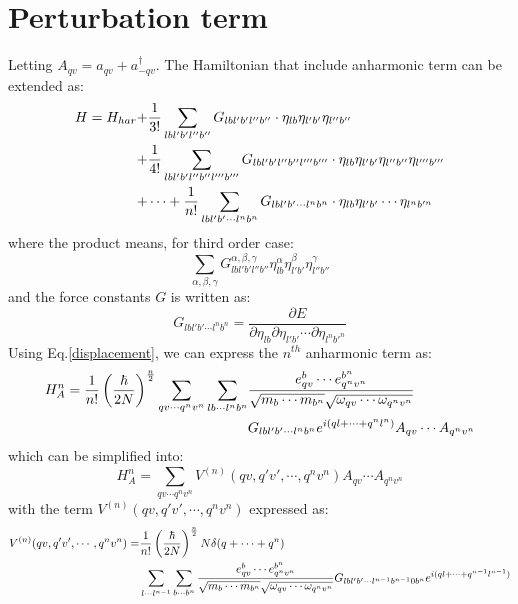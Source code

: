 \documentclass{article}
\begin{document}
\section{Perturbation term}
Letting $A_{qv} = a_{qv} + a^{\dagger}_{-qv}$. The Hamiltonian that include anharmonic term can be extended as:
\begin{align}
    H = H_{har} + &\frac{1}{3!}\sum_{lbl'b'l''b''} G_{lbl'b'l''b''} \cdot \eta_{lb} \eta_{l'b'}\eta_{l''b''} \notag \\
                + &\frac{1}{4!}\sum_{lbl'b'l''b''l'''b'''} G_{lbl'b'l''b''l'''b'''} \cdot \eta_{lb} \eta_{l'b'}\eta_{l''b''} \eta_{l'''b'''} \notag \\
                + & \cdots + \frac{1}{n!}\sum_{lbl'b'\cdots l^nb^n} G_{lbl'b'\cdots l^nb^n} \cdot \eta_{lb} \eta_{l'b'}\cdots \eta_{l^nb'^n} 
\end{align}
where the product means, for third order case:
\begin{equation}
    \sum_{\alpha,\beta,\gamma} G_{lbl'b'l''b''}^{\alpha,\beta,\gamma} \eta_{lb}^{\alpha} \eta_{l'b'}^{\beta}\eta_{l''b''}^{\gamma}
\end{equation}
and the force constants $G$ is written as:
\begin{equation}
    G_{lbl'b'\cdots l^nb^n} = \frac{\partial E}{\partial \eta_{lb} \partial \eta_{l'b'} \cdots \partial \eta_{l^nb'^n} }
\end{equation}
Using Eq.\ref{displacement}, we can express the $n^{th}$ anharmonic term as:
\begin{align}
    H_{A}^{n} = \frac{1}{n!} \left( \frac{\hbar}{2N} \right)^{\frac{n}{2}} \sum_{qv \cdots q^nv^n} \sum_{lb\cdots l^nb^n} 
    &\frac{e_{qv}^b \cdots e_{q^nv^n}^{b^n}}{\sqrt{m_b \cdots m_{b^n}}\sqrt{\omega_{qv} \cdots \omega_{q^nv^n}}} \notag \\
    &G_{lbl'b'\cdots l^nb^n} e^{i(ql + \cdots + q^nl^n)}
    A_{qv} \cdots A_{q^nv^n}
\end{align}
which can be simplified into:
\begin{equation}
    H_{A}^{n} = \sum_{qv \cdots q^nv^n} V^{(n)}(qv,q'v',\cdots,q^nv^n)
    A_{qv} \cdots A_{q^nv^n}
\end{equation}
with the term $V^{(n)}(qv,q'v',\cdots,q^nv^n)$ expressed as:
\begin{align}
    V^{(n)}(qv,q'v',\cdots,q^nv^n) = &\frac{1}{n!} \left( \frac{\hbar}{2N} \right)^{\frac{n}{2}} N\delta(q + \cdots + q^n) \notag \\
     &\sum_{l\cdots l^{n-1}} \sum_{b\cdots b^n} 
    \frac{e_{qv}^b \cdots e_{q^nv^n}^{b^n}}{\sqrt{m_b \cdots m_{b^n}}\sqrt{\omega_{qv} \cdots \omega_{q^nv^n}}} G_{lbl'b'\cdots l^{n-1}b^{n-1}0b^n} e^{i(ql + \cdots + q^{n-1}l^{n-1})}
\end{align}
\end{document}
